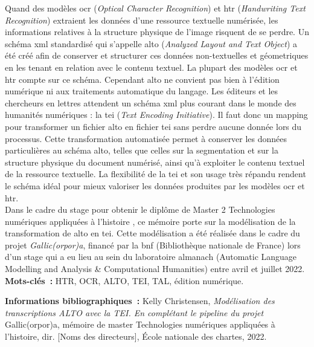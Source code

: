 \documentclass[class=article, crop=false]{standalone}
\begin{document}
\medskip

Quand des modèles \acrshort{ocr} (\textit{Optical Character Recognition}) et \acrshort{htr} (\textit{Handwriting Text Recognition}) extraient les données d'une ressource textuelle numérisée, les informations relatives à la structure physique de l'image risquent de se perdre. Un schéma \acrshort{xml} standardisé qui s'appelle \acrshort{alto} (\textit{Analyzed Layout and Text Object}) a été créé afin de conserver et structurer ces données non-textuelles et géometriques en les tenant en relation avec le contenu textuel. La plupart des modèles \acrshort{ocr} et \acrshort{htr} compte sur ce schéma. Cependant \acrshort{alto} ne convient pas bien à l'édition numérique ni aux traitements automatique du langage. Les éditeurs et les chercheurs en lettres attendent un schéma \acrshort{xml} plus courant dans le monde des humanités numériques : la \acrshort{tei} (\textit{Text Encoding Initiative}). Il faut donc un mapping pour transformer un fichier \acrshort{alto} en fichier \acrshort{tei} sans perdre aucune donnée lors du processus. Cette transformation automatisée permet à conserver les données particulières au schéma \acrshort{alto}, telles que celles sur la segmentation et sur la structure physique du document numérisé, ainsi qu'à exploiter le contenu textuel de la ressource textuelle. La flexibilité de la \acrshort{tei} et son usage très répandu rendent le schéma idéal pour mieux valoriser les données produites par les modèles \acrshort{ocr} et \acrshort{htr}.\\

Dans le cadre du stage pour obtenir le diplôme de Master 2 \og Technologies numériques appliquées à l'histoire \fg{}, ce mémoire porte sur la modélisation de la transformation de \acrshort{alto} en \acrshort{tei}. Cette modélisation a été réalisée dans le cadre du projet \textit{Gallic(orpor)a}, financé par la \acrshort{bnf} (Bibliothèque nationale de France) lors d'un stage qui a eu lieu au sein du laboratoire \acrshort{almanach} (Automatic Language Modelling and Analysis \& Computational Humanities) entre avril et juillet 2022.\\
	
	\textbf{Mots-clés~:} HTR, OCR, ALTO, TEI, TAL, édition numérique.
	
	\textbf{Informations bibliographiques~:} Kelly Christensen, \textit{Modélisation des transcriptions ALTO avec la TEI. En complétant le pipeline du projet} Gallic(orpor)a, mémoire de master \og{}Technologies numériques appliquées à l'histoire\fg{}, dir. [Noms des directeurs], École nationale des chartes, 2022.
	
\end{document}
